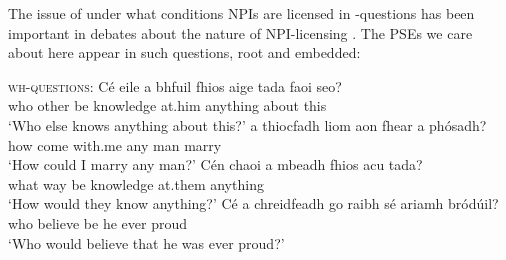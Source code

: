 \documentclass[output=paper,colorlinks,citecolor=brown]{langscibook}
\begin{document}
The issue of under what conditions NPIs are licensed in \Wh-questions has been important in debates about the nature of NPI-licensing \parencite{giannakidou:99, giannakidou:11, guerzoni-sharvit:07, mayr:13}. The PSEs we care about here appear in such questions, root and embedded: 


\ea\label{ex:wh.q}
\textsc{wh-questions}:
\ea
\gll Cé eile a bhfuil fhios aige tada faoi seo? \\
     who other {\go} {be\pres} knowledge at.him anything about this \\
\glt `Who else knows anything about this?'
\ex
{} a thiocfadh liom aon fhear a phósadh? \\
     how    {\C} {come\cond} with.me any man {\vce}  {marry\vn} \\
\glt `How could I marry any man?'
\ex
\gll Cén chaoi a mbeadh fhios acu tada? \\
     what way {\go} {be\cond} knowledge at.them anything \\
\glt `How would they know anything?'
\ex
\gll Cé a chreidfeadh go raibh sé ariamh bródúil? \\
     who {\go} {believe\cond} {\go} {be\past} he ever proud \\
\glt `Who would believe that he was ever proud?'
\z
\z
{}

\end{document}
